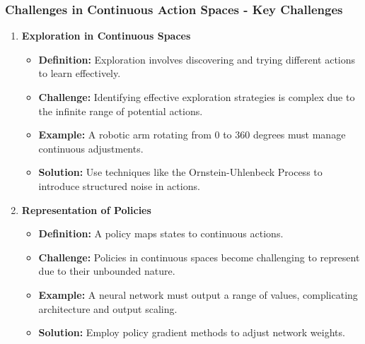 \documentclass[aspectratio=169]{beamer}
\begin{document}
\begin{frame}[fragile]
    \frametitle{Challenges in Continuous Action Spaces - Key Challenges}
    \begin{enumerate}
        \item \textbf{Exploration in Continuous Spaces}
            \begin{itemize}
                \item \textbf{Definition:} Exploration involves discovering and trying different actions to learn effectively.
                \item \textbf{Challenge:} Identifying effective exploration strategies is complex due to the infinite range of potential actions.
                \item \textbf{Example:} A robotic arm rotating from 0 to 360 degrees must manage continuous adjustments.
                \item \textbf{Solution:} Use techniques like the Ornstein-Uhlenbeck Process to introduce structured noise in actions.
            \end{itemize}
        
        \item \textbf{Representation of Policies}
            \begin{itemize}
                \item \textbf{Definition:} A policy maps states to continuous actions.
                \item \textbf{Challenge:} Policies in continuous spaces become challenging to represent due to their unbounded nature.
                \item \textbf{Example:} A neural network must output a range of values, complicating architecture and output scaling.
                \item \textbf{Solution:} Employ policy gradient methods to adjust network weights.
            \end{itemize}
    \end{enumerate}
\end{frame}
\end{document}
